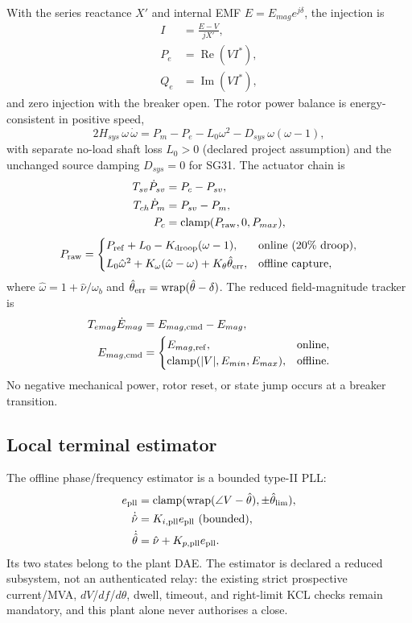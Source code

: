 \documentclass[12pt,a4paper]{article}
\DeclareMathOperator{\clamp}{clamp}
\begin{document}
With the series reactance $X'$ and internal EMF
$E=E_{mag}e^{j\delta}$, the injection is
\begin{align}
I&=\frac{E-V}{jX'},\\
P_e&=\operatorname{Re}(V I^*),\\
Q_e&=\operatorname{Im}(V I^*),
\end{align}
and zero injection with the breaker open.  The rotor power balance is
energy-consistent in positive speed,
\[
2H_{sys}\,\omega\,\dot\omega
   =P_m-P_e-L_0\omega^2-D_{sys}\,\omega(\omega-1),
\]
with separate no-load shaft loss $L_0>0$ (declared project assumption) and the
unchanged source damping $D_{sys}=0$ for SG31.  The actuator chain is
\begin{align}
T_{sv}\dot P_{sv}&=P_c-P_{sv},\\
T_{ch}\dot P_m&=P_{sv}-P_m,\\
P_c&=\clamp(P_{\rm raw},0,P_{max}),
\end{align}
\[
P_{\rm raw}=
\begin{cases}
P_{\rm ref}+L_0-K_{\rm droop}(\omega-1), & \text{online (20\% droop)},\\[2pt]
L_0\hat\omega^2+K_\omega(\hat\omega-\omega)+K_\theta\hat\theta_{\rm err}, & \text{offline capture},
\end{cases}
\]
where $\hat\omega=1+\hat\nu/\omega_b$ and
$\hat\theta_{\rm err}=\operatorname{wrap}(\hat\theta-\delta)$.  The reduced
field-magnitude tracker is
\begin{align}
T_{emag}\dot E_{mag}&=E_{mag,\rm cmd}-E_{mag},\\
E_{mag,\rm cmd}&=
\begin{cases}
E_{mag,\rm ref}, & \text{online},\\
\clamp(|V|,E_{min},E_{max}), & \text{offline}.
\end{cases}
\end{align}
No negative mechanical power, rotor reset, or state jump occurs at a breaker
transition.

\subsection{Local terminal estimator}

The offline phase/frequency estimator is a bounded type-II PLL:
\begin{align}
e_{\rm pll}&=\clamp(\operatorname{wrap}(\angle V-\hat\theta),\pm\hat\theta_{\rm lim}),\\
\dot{\hat\nu}&=K_{i,\rm pll}e_{\rm pll}\ \text{(bounded)},\\
\dot{\hat\theta}&=\hat\nu+K_{p,\rm pll}e_{\rm pll}.
\end{align}
Its two states belong to the plant DAE.  The estimator is declared a
reduced subsystem, not an authenticated relay: the existing strict
prospective current/MVA, $dV$/$df$/$d\theta$, dwell, timeout, and right-limit
KCL checks remain mandatory, and this plant alone never authorises a close.
\end{document}

